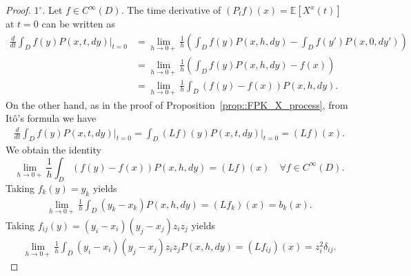 \documentclass[11pt]{article}
\numberwithin{equation}{section}
\theoremstyle{definition}
\begin{document}
\begin{proof}
$1^{\circ}.$ Let $f\in C^{\infty}(D)$. The time derivative of $(P_{t}f)(x)=\mathbb{E}[X^{x}(t)]$ at $t=0$ can be written as 
    \begin{align*}
        \frac{d}{dt}\int_{ D}f(y)P(x,t,dy)\Big|_{t=0}
        &= \lim\limits_{h\to 0+}\frac{1}{h}\left(\int_{ D}f(y)P(x,h,dy) - \int_{ D}f(y')P(x,0,dy')\right) \\ 
        &=\lim\limits_{h\to 0+}\frac{1}{h}\left(\int_{ D}f(y)P(x,h,dy) -f(x)\right)  \\
        & = \lim\limits_{h\to 0+}\frac{1}{h}\int_{ D}\left(f(y)-f(x)\right)P(x,h,dy) .
    \end{align*}
On the other hand, as in the proof of Proposition~\ref{prop::FPK_X_process}, from Itô's formula we have
\begin{align*}
     \frac{d}{dt}\int_{ D}f(y)P(x,t,dy)\Big|_{t=0}
     = \int_{D}(Lf)(y)P(x,t,dy)\Big|_{t=0}
     = (Lf)(x).
\end{align*}
We obtain the identity
\[
    \lim\limits_{h\to 0+}\frac{1}{h}\int_{ D}\left(f(y)-f(x)\right)P(x,h,dy)  = (Lf)(x) \quad\forall f\in C^{\infty}(D).
\]
Taking $f_{k}(y)=y_{k}$ yields
\begin{align*}
\lim\limits_{h\to 0+}\frac{1}{h}\int_{ D}\left(y_{k}-x_{k}\right)P(x,h,dy) 
=(Lf_{k})(x)=b_{k}(x).
\end{align*}
Taking $f_{ij}(y) =(y_{i}-x_{i})(y_{j}-x_{j})z_{i}z_{j}$ yields
\begin{align*}
   \lim\limits_{h\to 0+}\frac{1}{h}\int_{ D}(y_{i}-x_{i})(y_{j}-x_{j})z_{i}z_{j}P(x,h,dy) =  (Lf_{ij})(x) = z_{i}^2\delta_{ij}.
\end{align*}


\end{proof}
\end{document}

